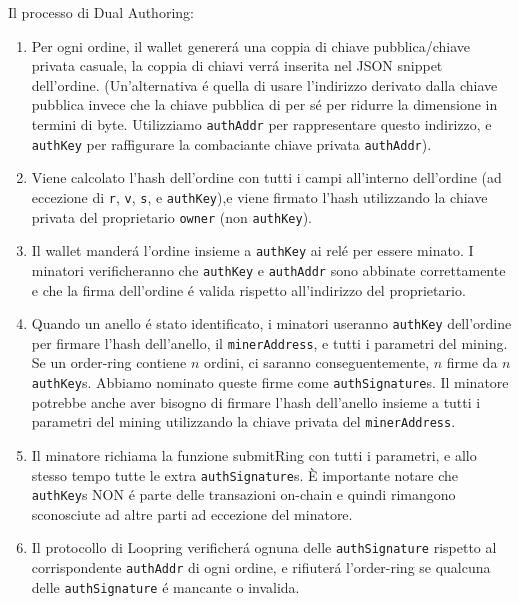 \documentclass[UTF8,nofonts]{article}
\begin{document}
\begin{multicols}{2}
Il processo di Dual Authoring:
\begin{enumerate}
	\item Per ogni ordine, il wallet generer\'a una coppia di chiave pubblica/chiave privata casuale, la coppia di chiavi verr\'a inserita nel JSON snippet dell'ordine. (Un'alternativa \'e quella di usare l'indirizzo derivato dalla chiave pubblica invece che la chiave pubblica di per s\'e per ridurre la dimensione in termini di byte. Utilizziamo \verb|authAddr| per rappresentare questo indirizzo, e \verb|authKey|  per raffigurare la combaciante chiave privata \verb|authAddr|).
	\item Viene calcolato l'hash dell'ordine con tutti i campi all'interno dell'ordine (ad eccezione di \verb|r|, \verb|v|, \verb|s|, e \verb|authKey|),e viene firmato l'hash utilizzando la chiave privata del proprietario \verb|owner| (non \verb|authKey|).
	\item Il wallet mander\'a l'ordine insieme a \verb|authKey|  ai rel\'e per essere minato. I minatori verificheranno che \verb|authKey| e \verb|authAddr| sono abbinate correttamente e che la firma dell'ordine \'e valida rispetto all'indirizzo del proprietario.
	\item Quando un anello \'e stato identificato, i minatori useranno \verb|authKey| dell'ordine per firmare l'hash dell'anello,  il  \verb|minerAddress|, e tutti i parametri del mining. Se un order-ring contiene $n$ ordini, ci saranno conseguentemente, $n$ firme da $n$ \verb|authKey|s. Abbiamo nominato queste firme come \verb|authSignature|s. Il minatore potrebbe anche aver bisogno di firmare l'hash dell'anello insieme a tutti i parametri del mining utilizzando la chiave privata del \verb|minerAddress|.
	\item  Il minatore richiama la funzione submitRing con tutti i parametri, e allo stesso tempo tutte le extra \verb|authSignature|s. È importante notare che \verb|authKey|s  NON \'e parte delle transazioni on-chain e quindi rimangono sconosciute ad altre parti ad eccezione del minatore.
	\item Il protocollo di Loopring verificher\'a ognuna delle \verb|authSignature| rispetto al corrispondente \verb|authAddr| di ogni ordine, e rifiuter\'a l'order-ring se qualcuna delle \verb|authSignature|  \'e mancante o invalida.


\end{enumerate}
\end{multicols}
\end{document}
